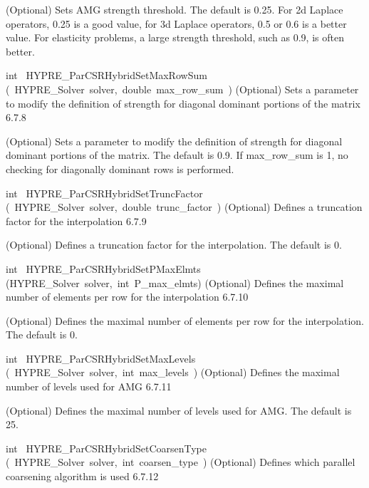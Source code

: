 \documentclass{article}
\begin{document}
\begin{cxxentry}
\begin{cxxentry}
\begin{cxxfunction}
\begin{cxxdoc}
(Optional) Sets AMG strength threshold. The default is 0.25.
For 2d Laplace operators, 0.25 is a good value, for 3d Laplace
operators, 0.5 or 0.6 is a better value. For elasticity problems,
a large strength threshold, such as 0.9, is often better.
\end{cxxdoc}
\end{cxxfunction}
\begin{cxxfunction}
{int\ }
        {HYPRE\_ParCSRHybridSetMaxRowSum}
        {(\ HYPRE\_Solver\ solver,\ double\ max\_row\_sum\ )}
        {
(Optional) Sets a parameter to modify the definition of strength for
diagonal dominant portions of the matrix}
        {6.7.8}
\begin{cxxdoc}

(Optional) Sets a parameter to modify the definition of strength for
diagonal dominant portions of the matrix. The default is 0.9.
If max\_row\_sum is 1, no checking for diagonally dominant rows is
performed.
\end{cxxdoc}
\end{cxxfunction}
\begin{cxxfunction}
{int\ }
        {HYPRE\_ParCSRHybridSetTruncFactor}
        {(\ HYPRE\_Solver\ solver,\ double\ trunc\_factor\ )}
        {
(Optional) Defines a truncation factor for the interpolation}
        {6.7.9}
\begin{cxxdoc}

(Optional) Defines a truncation factor for the interpolation.
The default is 0.
\end{cxxdoc}
\end{cxxfunction}
\begin{cxxfunction}
{int\ }
        {HYPRE\_ParCSRHybridSetPMaxElmts}
        {(HYPRE\_Solver\ solver,\ int\ P\_max\_elmts)}
        {
(Optional) Defines the maximal number of elements per row for the interpolation}
        {6.7.10}
\begin{cxxdoc}

(Optional) Defines the maximal number of elements per row for the interpolation.
The default is 0.
\end{cxxdoc}
\end{cxxfunction}
\begin{cxxfunction}
{int\ }
        {HYPRE\_ParCSRHybridSetMaxLevels}
        {(\ HYPRE\_Solver\ solver,\ int\ max\_levels\ )}
        {
(Optional) Defines the maximal number of levels used for AMG}
        {6.7.11}
\begin{cxxdoc}

(Optional) Defines the maximal number of levels used for AMG.
The default is 25.
\end{cxxdoc}
\end{cxxfunction}
\begin{cxxfunction}
{int\ }
        {HYPRE\_ParCSRHybridSetCoarsenType}
        {(\ HYPRE\_Solver\ solver,\ int\ coarsen\_type\ )}
        {
(Optional) Defines which parallel coarsening algorithm is used}
        {6.7.12}
\begin{cxxdoc}


\end{cxxdoc}
\end{cxxfunction}
\end{cxxentry}
\end{cxxentry}
\end{document}
